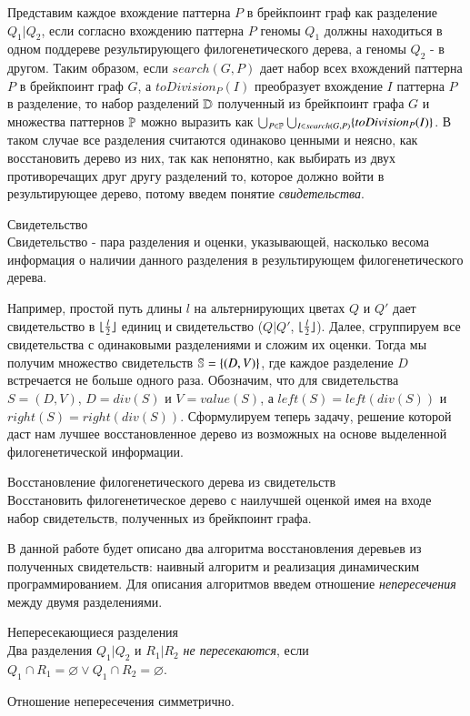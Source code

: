 Представим каждое вхождение паттерна $P$ в брейкпоинт граф как разделение $Q_1|Q_2$,
если согласно вхождению паттерна $P$ геномы $Q_1$ должны находиться в одном поддереве результирующего филогенетического дерева,
а геномы $Q_2$ - в другом.
Таким образом, если $search(G, P)$ дает набор всех вхождений паттерна $P$ в брейкпоинт граф $G$,
а $toDivision_P(I)$ преобразует вхождение $I$ паттерна $P$ в разделение,
то набор разделений $\mathbb{D}$ полученный из брейкпоинт графа $G$ и множества паттернов $\mathbb{P}$ можно выразить как
$\bigcup\nolimits_{P \in \mathbb{P}} \bigcup\nolimits_{I \in search(G, P)} \{toDivision_P(I)\}$.
В таком случае все разделения считаются одинаково ценными и неясно, как восстановить дерево из них, так как непонятно,
как выбирать из двух противоречащих друг другу разделений то, которое должно войти в результирующее дерево,
потому введем понятие \textit{свидетельства}.
\begin{define}{Свидетельство}\\
  Свидетельство - пара разделения и оценки, указывающей, насколько весома информация о наличии данного разделения в результирующем филогенетического дерева.
\end{define}
Например, простой путь длины $l$ на альтернирующих цветах $Q$ и $Q'$ дает свидетельство в $\lfloor\frac{l}{2}\rfloor$ единиц и
свидетельство ($Q|Q'$, $\lfloor\frac{l}{2}\rfloor$).
Далее, сгруппируем все свидетельства с одинаковыми разделениями и сложим их оценки.
Тогда мы получим множество свидетельств $\mathbb{S} = \{(D, V)\}$, где каждое разделение $D$ встречается не больше одного раза.
Обозначим, что для свидетельства $S = (D, V)$, $D = div(S)$ и $V = value(S)$, а $left(S) = left(div(S))$ и $right(S) = right(div(S))$.
Сформулируем теперь задачу, решение которой даст нам лучшее восстановленное дерево из возможных на основе выделенной филогенетической информации.
\begin{task}{Восстановление филогенетического дерева из свидетельств} \\
  Восстановить филогенетическое дерево с наилучшей оценкой имея на входе набор свидетельств,
  полученных из брейкпоинт графа.
\end{task}

В данной работе будет описано два алгоритма восстановления деревьев из полученных свидетельств:
наивный алгоритм и реализация динамическим программированием.
Для описания алгоритмов введем отношение \textit{непересечения} между двумя разделениями.
\begin{define}{Непересекающиеся разделения} \\
  Два разделения $Q_1|Q_2$ и $R_1|R_2$ \textit{не пересекаются},
  если $Q_1 \cap R_1 = \varnothing \lor Q_1 \cap R_2 = \varnothing $.
\end{define}
\noindent Отношение непересечения симметрично.


